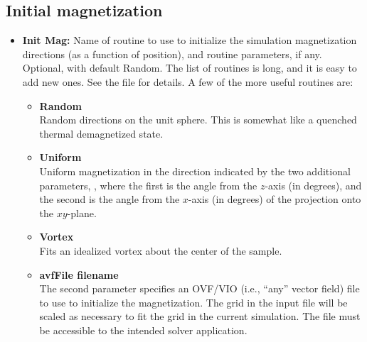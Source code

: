 \subsection{Initial magnetization}\label{sec:mif1initmag}%
\begin{itemize}
   \item {\bf Init Mag:} Name of routine to use to initialize the
   simulation magnetization directions (as a function of position), and
   routine parameters, if any.  Optional, with default Random.  The list
   of routines is long, and it is easy to add new ones.  See the file
    for details.  A few of the more
   useful routines are:
   \begin{itemize}
      \item {\bf Random}\\
         Random directions on the unit sphere.  This
         is somewhat like a quenched thermal demagnetized state.
      \item {\bf Uniform \latex{\boldmath$\theta$ $\phi$}}\\
         Uniform magnetization in the direction
         indicated by the two additional parameters, , where the first is the angle
         from the $z$-axis (in degrees), and the second is the angle
         from the $x$-axis (in degrees) of the projection onto the
         $xy$-plane.
      \item {\bf Vortex}\\
         Fits an idealized vortex about the center of the
         sample.
      \item {\bf avfFile filename}\\
         The second parameter specifies an OVF/VIO (i.e., ``any''
         vector field) file to use to
         initialize the magnetization. The grid in the input file will
         be scaled as necessary to fit the grid in the current
         simulation.  The file must be accessible to the intended solver
         application.
   \end{itemize}
\end{itemize}

